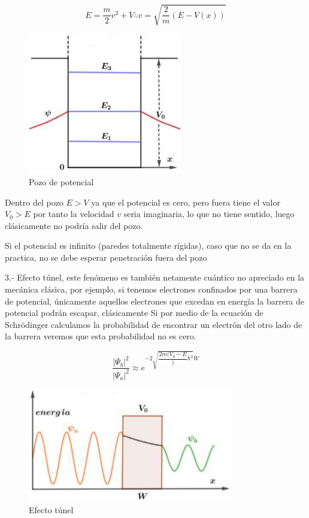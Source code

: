 \begin{equation}
	E=\dfrac{m}{2}v^{2} + V \therefore v= \sqrt{\dfrac{2}{m}\left( E-V(x) \right)} 
\end{equation}

\begin{figure}[H]
    \centering
    \includegraphics[width=0.60\textwidth]{./Figures/fig17}
	\caption{Pozo de potencial}
	\label{fig:17}
 \end{figure}

Dentro
del pozo $E>V$ ya que el potencial es cero, pero fuera tiene el valor $V_{0}>E$ por tanto la velocidad $v$ seria imaginaria, lo que no tiene sentido, luego clásicamente no podría salir del pozo.

Si el potencial es infinito (paredes totalmente rígidas), caso que no se da en la practica, no se debe
esperar penetración fuera del pozo

3.- Efecto túnel, este fenómeno es también netamente cuántico no apreciado en la mecánica clásica, por ejemplo, si tenemos electrones confinados por una barrera de potencial, únicamente aquellos electrones que excedan en energía la barrera de potencial podrán escapar, clásicamente Si por medio de la ecuación de Schrödinger calculamos la probabilidad de encontrar un electrón del otro lado de la barrera veremos que esta probabilidad no es cero.

\begin{equation}
	\dfrac{\vert\Psi_{b}\vert^{2}}{\vert\Psi_{a}\vert^{2}} \approx e^{-2\sqrt{\dfrac{2m(V_{0}-E}){\hbar^{2}}}W} 
\end{equation}

\begin{figure}[H]
    \centering
    \includegraphics[width=0.80\textwidth]{./Figures/fig18}
	\caption{Efecto túnel}
	\label{fig:18}
 \end{figure}

